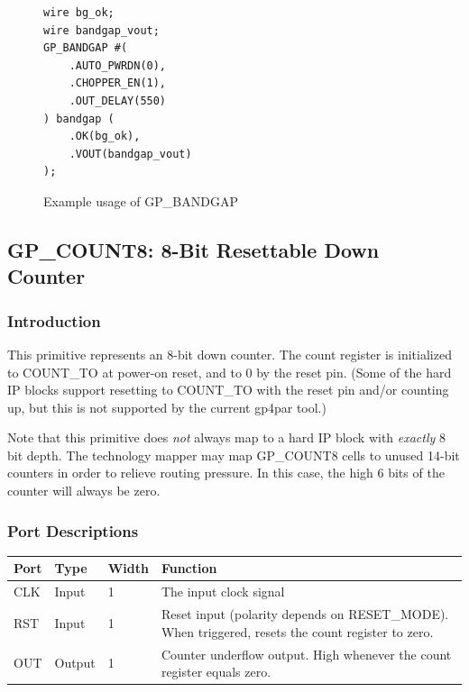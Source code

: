 \documentclass[11pt]{article}
\begin{document}
\begin{figure}[h]
\begin{lstlisting}
wire bg_ok;
wire bandgap_vout;
GP_BANDGAP #(
	.AUTO_PWRDN(0),
	.CHOPPER_EN(1),
	.OUT_DELAY(550)
) bandgap (
	.OK(bg_ok),
	.VOUT(bandgap_vout)
);
\end{lstlisting}
\caption{Example usage of GP\_BANDGAP}
\label{gp-bandgap-example}
\end{figure}


\pagebreak
\subsection{GP\_COUNT8: 8-Bit Resettable Down Counter}

\subsubsection{Introduction}
This primitive represents an 8-bit down counter. The count register is initialized to COUNT\_TO at power-on reset, and 
to 0 by the reset pin. (Some of the hard IP blocks support resetting to COUNT\_TO with the reset pin and/or counting 
up, but this is not supported by the current gp4par tool.)

Note that this primitive does \emph{not} always map to a hard IP block with \emph{exactly} 8 bit depth. The technology 
mapper may map GP\_COUNT8 cells to unused 14-bit counters in order to relieve routing pressure. In this case, the high 
6 bits of the counter will always be zero.

\subsubsection{Port Descriptions}

\begin{tabularx}{5in}{|l|l|l|X|}
\hline
{\bfseries Port} & {\bfseries Type} & {\bfseries Width} & {\bfseries Function} \\
\hline
CLK & Input & 1 & The input clock signal\\
\hline
RST & Input & 1 & Reset input (polarity depends on RESET\_MODE). When triggered, resets the count register to zero. \\
\hline
OUT & Output & 1 & Counter underflow output. High whenever the count register equals zero. \\
\hline
\end{tabularx}
\end{document}
